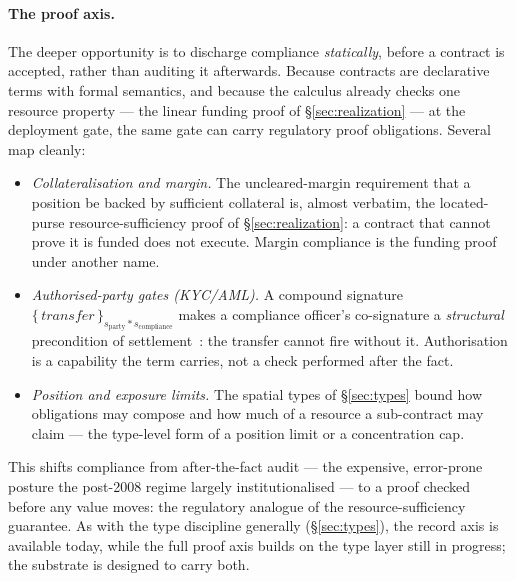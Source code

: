 \documentclass[11pt]{article}
\theoremstyle{definition}
\theoremstyle{plain}
\begin{document}
\paragraph{The proof axis.} The deeper opportunity is to discharge compliance \emph{statically},
before a contract is accepted, rather than auditing it afterwards. Because contracts are declarative
terms with formal semantics, and because the calculus already checks one resource property --- the
linear funding proof of \S\ref{sec:realization} --- at the deployment gate, the same gate can carry
regulatory proof obligations. Several map cleanly:
\begin{itemize}[leftmargin=1.4em,itemsep=2pt]
\item \emph{Collateralisation and margin.} The uncleared-margin requirement that a position be backed
by sufficient collateral is, almost verbatim, the located-purse resource-sufficiency proof of
\S\ref{sec:realization}: a contract that cannot prove it is funded does not execute. Margin compliance
is the funding proof under another name.
\item \emph{Authorised-party gates (KYC/AML).} A compound signature
$\{\,\mathit{transfer}\,\}_{s_{\mathrm{party}} * s_{\mathrm{compliance}}}$ makes a compliance officer's
co-signature a \emph{structural} precondition of settlement~\cite[\S2.4]{CAR2026}: the transfer cannot
fire without it. Authorisation is a capability the term carries, not a check performed after the fact.
\item \emph{Position and exposure limits.} The spatial types of \S\ref{sec:types} bound how
obligations may compose and how much of a resource a sub-contract may claim --- the type-level form of
a position limit or a concentration cap.
\end{itemize}
This shifts compliance from after-the-fact audit --- the expensive, error-prone posture the post-2008
regime largely institutionalised --- to a proof checked before any value moves: the regulatory analogue
of the resource-sufficiency guarantee. As with the type discipline generally (\S\ref{sec:types}), the
record axis is available today, while the full proof axis builds on the type layer still in progress;
the substrate is designed to carry both.
\end{document}
